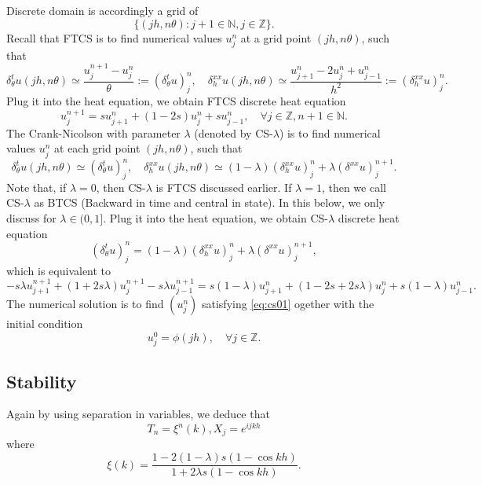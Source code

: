 \documentclass{article}
\begin{document}
Discrete domain is accordingly a grid of
$$\{(jh, n\theta): j +1 \in \mathbb N, j\in \mathbb Z\}.$$
Recall that FTCS is to find numerical values
$u_{j}^{n}$ at a grid point $(jh, n\theta)$, 
such that
$$\delta_{\theta}^{t} u(jh, n\theta) \simeq 
\frac{u_{j}^{n+1} - u_{j}^{n}}{\theta} := (\delta^{t}_{\theta} u)_{j}^{n}, 
\quad 
\delta^{xx}_{h}u(jh, n\theta) \simeq 
\frac{u_{j+1}^{n} - 2u_{j}^{n} + u_{j-1}^{n}}{h^{2}} 
:=( \delta^{xx}_{h} u)_{j}^{n}.$$
Plug it into the heat equation, we obtain FTCS discrete heat equation 
\begin{equation}
\label{eq:ftcs01}
u_{j}^{n+1} = s u_{j+1}^{n} + (1-2s) u_{j}^{n} + s u_{j-1}^{n}, \quad \forall j\in \mathbb Z, n+1 \in \mathbb N. 
\end{equation}
The Crank-Nicolson with parameter $\lambda$ (denoted by CS-$\lambda$) is 
to find numerical values
$u_{j}^{n}$ at each grid point $(jh, n\theta)$, 
such that
$$\delta_{\theta}^{t} u(jh, n\theta) \simeq  (\delta^{t}_{\theta} u)_{j}^{n}, 
\quad 
\delta^{xx}_{h}u(jh, n\theta) \simeq 
(1 - \lambda)( \delta^{xx}_{h} u)_{j}^{n} + \lambda ( \delta^{xx} u)^{n+1}_{j}.$$
Note that, if $\lambda =0$, then CS-$\lambda$ is FTCS discussed earlier.
If $\lambda = 1$, then we call CS-$\lambda$ as BTCS (Backward in time and central in state). In this below, we only discuss for $\lambda \in (0,1]$.
Plug it into the heat equation, we obtain 
CS-$\lambda$ discrete heat equation 
$$(\delta^{t}_{\theta} u)_{j}^{n} = (1 - \lambda)( \delta^{xx}_{h} u)_{j}^{n} + \lambda ( \delta^{xx} u)^{n+1}_{j},$$
which is equivalent to
\begin{equation}
 \label{eq:cs01}
 -s \lambda u_{j+1}^{n+1} + (1 + 2s\lambda) u_{j}^{n+1} - s\lambda u_{j-1}^{n+1} = s(1 - \lambda) u_{j+1}^{n} + (1 - 2s + 2s\lambda) u_{j}^{n} + 
 s(1 - \lambda) u_{j-1}^{n}.
 \end{equation}
The numerical solution is to find $(u_{j}^{n})$ satisfying \eqref{eq:cs01}   ogether with the initial condition
\begin{equation}
 \label{eq:ftcs00}
 u_{j}^{0} = \phi(jh), \quad \forall j\in \mathbb Z.
\end{equation}

 

\subsection{Stability}
 

Again by using separation in variables, we deduce that
$$T_{n} = \xi^{n}(k), X_{j} = e^{ijk h}$$
where 
\begin{equation}
 \label{eq:xi}
 \xi(k) = \frac{1 - 2(1-\lambda) s(1 - \cos k h)}{1+2\lambda s(1 - \cos k h)}.
\end{equation}
\end{document}
